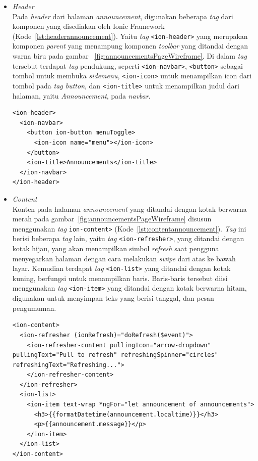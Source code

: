 \begin{enumerate}
\begin{enumerate}
	\begin{itemize}
		\item \textit{Header} \\
		Pada \textit{header} dari halaman \textit{announcement}, digunakan beberapa \textit{tag} dari komponen yang disediakan oleh Ionic Framework (Kode~\ref{lst:headerannouncement}). Yaitu \textit{tag} \texttt{<ion-header>} yang merupakan komponen \textit{parent} yang menampung komponen \textit{toolbar} yang ditandai dengan warna biru pada gambar ~\ref{fig:announcementsPageWireframe}. Di dalam \textit{tag} tersebut terdapat \textit{tag} pendukung, seperti \texttt{<ion-navbar>}, \texttt{<button>} sebagai tombol untuk membuka \textit{sidemenu}, \texttt{<ion-icon>} untuk menampilkan icon dari tombol pada \textit{tag button}, dan \texttt{<ion-title>} untuk menampilkan judul dari halaman, yaitu \textit{Announcement}, pada \textit{navbar}.
\begin{lstlisting}[label={lst:headerannouncement}, caption=\textit{Header} pada Halaman \textit{Annoncement}]
<ion-header>
  <ion-navbar>
    <button ion-button menuToggle>
      <ion-icon name="menu"></ion-icon>
    </button>
    <ion-title>Announcements</ion-title>
  </ion-navbar>
</ion-header>
\end{lstlisting} 

		\item \textit{Content} \\
		Konten pada halaman \textit{announcement} yang ditandai dengan kotak berwarna merah pada gambar~\ref{fig:announcementsPageWireframe} disusun menggunakan \textit{tag} \texttt{ion-content>} (Kode~\ref{lst:contentannouncement}). \textit{Tag} ini berisi beberapa \textit{tag} lain, yaitu \textit{tag} \texttt{<ion-refresher>}, yang ditandai dengan kotak hijau, yang akan menampilkan simbol \textit{refresh} saat pengguna menyegarkan halaman dengan cara melakukan \textit{swipe} dari atas ke bawah layar. Kemudian terdapat \textit{tag} \texttt{<ion-list>} yang ditandai dengan kotak kuning, berfungsi untuk menampilkan baris. Baris-baris tersebut diisi menggunakan \textit{tag} \texttt{<ion-item>} yang ditandai dengan kotak berwarna hitam, digunakan untuk menyimpan teks yang berisi tanggal, dan pesan pengumuman.

		
\begin{lstlisting}[label={lst:contentannouncement}, caption=\textit{Content} pada Halaman \textit{Annoncement}]
<ion-content>
  <ion-refresher (ionRefresh)="doRefresh($event)">
    <ion-refresher-content pullingIcon="arrow-dropdown" pullingText="Pull to refresh" refreshingSpinner="circles" refreshingText="Refreshing...">
    </ion-refresher-content>
  </ion-refresher>
  <ion-list>
    <ion-item text-wrap *ngFor="let announcement of announcements">
      <h3>{{formatDatetime(announcement.localtime)}}</h3>
      <p>{{announcement.message}}</p>
    </ion-item>
  </ion-list>
</ion-content>
\end{lstlisting} 
	\end{itemize}
	

\end{enumerate}
\end{enumerate}
